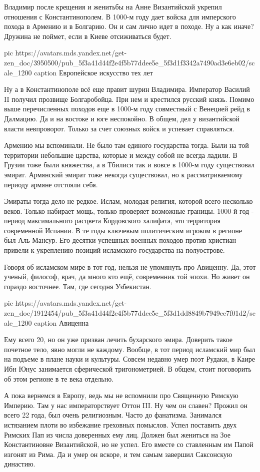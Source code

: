 Владимир после крещения и женитьбы на Анне Византийской укрепил отношения с
Константинополем. В 1000-м году дает войска для имперского похода в Армению и в
Болгарию. Он и сам лично идет в походе. Ну а как иначе? Дружина не поймет, если
в Киеве отсиживаться будет.

\ifcmt
pic https://avatars.mds.yandex.net/get-zen_doc/3950500/pub_5f3a41d44f2e4f5b77ddee5e_5f3d1f3342a7490ad3e6eb02/scale_1200
caption Европейское искусство тех лет
\fi

Ну а в Константинополе всё еще правит шурин Владимира. Император Василий II
получил прозвище Болгаробойца. При нем и крестился русский князь. Помимо выше
перечисленных походов еще в 1000-м году совместный с Венецией рейд в Далмацию.
Да и на востоке и юге неспокойно. В общем, дел у византийской власти
невпроворот. Только за счет союзных войск и успевает справляться.

Армению мы вспоминали. Не было там единого государства тогда. Были на той
территории небольшие царства, которые и между собой не всегда ладили. В Грузии
тоже были княжества, а в Тбилиси так и вовсе в 1000-м году существовал эмират.
Армянский эмират тоже некогда существовал, но к рассматриваемому периоду армяне
отстояли себя.

Эмираты тогда дело не редкое. Ислам, молодая религия, которой всего несколько
веков. Только набирает мощь, только проверяет возможные границы. 1000-й год -
период максимального расцвета Кордовского халифата, это территория современной
Испании. В те годы ключевым политическим игроком в регионе был Аль-Мансур. Его
десятки успешных военных походов против христиан привели к укреплению позиций
исламского государства на полуострове.

Говоря об исламском мире в тот год, нельзя не упомянуть про Авиценну. Да, этот
ученый, философ, врач, да много кто ещё, современник той эпохи. Но живет он
гораздо восточнее. Там, где сегодня Узбекистан.

\ifcmt
pic https://avatars.mds.yandex.net/get-zen_doc/1912454/pub_5f3a41d44f2e4f5b77ddee5e_5f3d1dd8849b7949ee7f01d2/scale_1200
caption Авиценна
\fi

Ему всего 20, но он уже призван лечить бухарского эмира. Доверить такое
почетное тело, явно могли не каждому. Вообще, в тот период исламский мир был на
подъеме в плане науки и культуры. Совсем недавно умер поэт Рудаки, в Каире Ибн
Юнус занимается сферической тригонометрией. В общем, стоит поговорить об этом
регионе в те века отдельно.

А пока вернемся в Европу, ведь мы не вспомнили про Священную Римскую Империю.
Там у нас императорствует Оттон III. Ну чем он славен? Прожил он всего 22 года,
был очень религиозным. Часто до фанатизма. Занимался истязанием плоти во
избежание греховных помыслов. Успел поставить двух Римских Пап из числа
доверенных ему лиц. Должен был жениться на Зое Константиновне Византийской, но
не успел. Его вместе со ставленным им Папой изгонят из Рима. Да и умер он
вскоре, и тем самым завершил Саксонскую династию.

